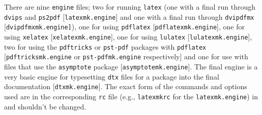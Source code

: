 \documentclass[11pt]{article}
\begin{document}
There are nine \texttt{engine} files; two for running \texttt{latex} (one with a final run through \texttt{dvips} and \texttt{ps2pdf} [\texttt{latexmk.engine}] and one with a final run through \texttt{dvipdfmx} [\texttt{dvipdfmxmk.engine]}), one for using \texttt{pdflatex} [\texttt{pdflatexmk.engine}], one for using \texttt{xelatex} [\texttt{xelatexmk.engine}], one for using \texttt{lulatex} [\texttt{lulatexmk.engine}], two for using the \texttt{pdftricks} or \texttt{pst-pdf} packages with \texttt{pdflatex} [\texttt{pdftricksmk.engine} or \texttt{pst-pdfmk.engine} respectively] and one for use with files that use the \texttt{asymptote} package [\texttt{asymptotemk.engine}]. The final engine is a very basic engine for typesetting \texttt{dtx} files for a package into the final documentation [\texttt{dtxmk.engine}]. The exact form of the commands and options used are in the corresponding \texttt{rc} file (e.g., \texttt{latexmkrc} for the \texttt{latexmk.engine}) in  and shouldn't be changed.
\end{document}
